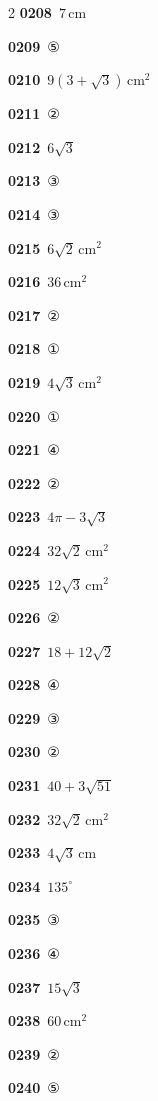 \documentclass[10pt,a4paper]{article}
\begin{document}
\begin{multicols}{2}
\noindent\textbf{0208}\ $7\,\mathrm{cm}$\par
\noindent\textbf{0209}\ ⑤\par
\noindent\textbf{0210}\ $9(3+\sqrt{3})\,\mathrm{cm}^2$\par
\noindent\textbf{0211}\ ②\par
\noindent\textbf{0212}\ $6\sqrt{3}$\par
\noindent\textbf{0213}\ ③\par
\noindent\textbf{0214}\ ③\par
\noindent\textbf{0215}\ $6\sqrt{2}\,\mathrm{cm}^2$\par
\noindent\textbf{0216}\ $36\,\mathrm{cm}^2$\par
\noindent\textbf{0217}\ ②\par
\noindent\textbf{0218}\ ①\par
\noindent\textbf{0219}\ $4\sqrt{3}\,\mathrm{cm}^2$\par
\noindent\textbf{0220}\ ①\par
\noindent\textbf{0221}\ ④\par
\noindent\textbf{0222}\ ②\par
\noindent\textbf{0223}\ $4\pi-3\sqrt{3}$\par
\noindent\textbf{0224}\ $32\sqrt{2}\,\mathrm{cm}^2$\par
\noindent\textbf{0225}\ $12\sqrt{3}\,\mathrm{cm}^2$\par
\noindent\textbf{0226}\ ②\par
\noindent\textbf{0227}\ $18+12\sqrt{2}$\par
\noindent\textbf{0228}\ ④\par
\noindent\textbf{0229}\ ③\par
\noindent\textbf{0230}\ ②\par
\noindent\textbf{0231}\ $40+3\sqrt{51}$\par
\noindent\textbf{0232}\ $32\sqrt{2}\,\mathrm{cm}^2$\par
\noindent\textbf{0233}\ $4\sqrt{3}\,\mathrm{cm}$\par
\noindent\textbf{0234}\ $135^\circ$\par
\noindent\textbf{0235}\ ③\par
\noindent\textbf{0236}\ ④\par
\noindent\textbf{0237}\ $15\sqrt{3}$\par
\noindent\textbf{0238}\ $60\,\mathrm{cm}^2$\par
\noindent\textbf{0239}\ ②\par
\noindent\textbf{0240}\ ⑤\par

\end{multicols}
\end{document}
